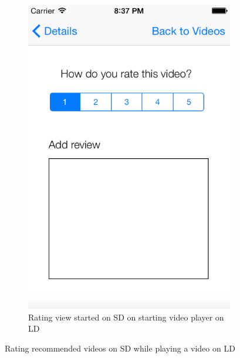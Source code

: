 \begin{figure}
\begin{subfigure}[b]{0.3\textwidth}
        \includegraphics[width=\textwidth]{ratingSD}
        \caption{Rating view started on SD on starting video player on LD}
        \label{fig:figure46b}
    \end{subfigure}
   \caption{Rating recommended videos on SD while playing a video on LD}\label{fig:figure46}
\end{figure}       
